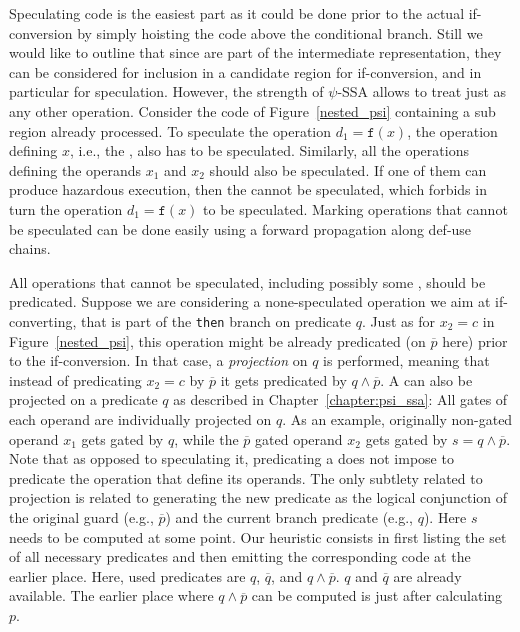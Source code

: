Speculating code is the easiest part as it could be done prior to the actual if-conversion by simply hoisting the code above the conditional branch. 
Still we would like to outline that since \psifuns are part of the intermediate representation, they can be considered for inclusion in a candidate region for if-conversion, and in particular for speculation. 
However, the strength of $\psi$-SSA allows to treat \psifuns just as any other operation. 
Consider the code of Figure~\ref{nested_psi} containing a sub region already processed. 
To speculate the operation $d_1=\texttt{f}(x)$, the operation defining $x$, i.e., the \psifun, also has to be speculated. 
Similarly, all the operations defining the operands $x_1$ and $x_2$ should also be speculated. 
If one of them can produce hazardous execution, then the \psifun cannot be speculated, which forbids in turn the operation $d_1=\texttt{f}(x)$ to be speculated. 
Marking operations that cannot be speculated can be done easily using a forward propagation along def-use chains.

All operations that cannot be speculated, including possibly some \psifuns, should be predicated. 
Suppose we are considering a none-speculated operation we aim at if-converting, that is part of the \texttt{then} branch on predicate $q$. 
Just as for $x_2=c$ in Figure~\ref{nested_psi}, this operation might be already predicated (on $\overline{p}$ here) prior to the if-conversion. 
In that case, a \textit{projection} on $q$ is performed, meaning that instead of predicating $x_2=c$ by $\overline{p}$ it gets predicated by $q\wedge \overline{p}$. 
A \psifun can also be projected on a predicate $q$ as described in Chapter~\ref{chapter:psi_ssa}: 
All gates of each operand are individually projected on $q$. 
As an example, originally non-gated operand $x_1$ gets gated by $q$, while the $\overline{p}$ gated operand $x_2$ gets gated by $s=q\wedge\overline{p}$. 
Note that as opposed to speculating it, predicating a \psifun does not impose to predicate the operation that define its operands. 
The only subtlety related to projection is related to generating the new predicate as the logical conjunction of the original guard (e.g., $\overline{p}$) and the current branch predicate (e.g., $q$). 
Here $s$ needs to be computed at some point. 
Our heuristic consists in first listing the set of all necessary predicates and then emitting the corresponding code at the earlier place. 
Here, used predicates are $q$, $\overline{q}$, and $q\wedge\overline{p}$. 
$q$ and $\overline{q}$ are already available. 
The earlier place where $q\wedge\overline{p}$ can be computed is just after calculating $p$.


